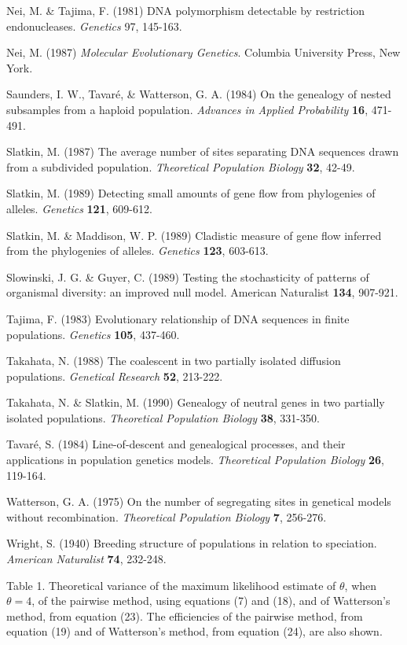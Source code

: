{Nei, M. \&  Tajima, F.  (1981)   DNA polymorphism detectable by
restriction endonucleases.  {\it Genetics} {97}, 145-163.
\medskip

Nei, M. (1987)   {\it Molecular Evolutionary Genetics}.  Columbia
University Press, New York.
\medskip

Saunders, I. W., Tavar\'{e}, \& Watterson, G. A. (1984)  On the genealogy of nested subsamples from a
haploid population.  {\it Advances in Applied Probability}  {\bf 16}, 471-491.
\medskip

Slatkin, M. (1987)  The average number of sites separating DNA sequences
drawn from a subdivided population.  {\it Theoretical Population Biology}  {\bf 32}, 42-49.
\medskip

Slatkin, M. (1989)  Detecting small amounts of gene flow from phylogenies of
alleles.  {\it Genetics}  {\bf 121}, 609-612.
\medskip

Slatkin, M. \& Maddison, W. P.  (1989)  Cladistic measure of gene flow
inferred from the phylogenies of alleles.  {\it Genetics}  {\bf 123}, 603-613.
\medskip

Slowinski, J. G. \& Guyer, C. (1989) Testing the stochasticity of patterns
of organismal diversity: an improved null model.  {American Naturalist} {\bf 134}, 907-921.

Tajima, F. (1983)   Evolutionary relationship of DNA sequences in finite
populations. {\it Genetics} {\bf 105}, 437-460.
\medskip

Takahata, N. (1988)  The coalescent in two partially isolated diffusion
populations.  {\it Genetical Research}  {\bf 52}, 213-222.
\medskip

Takahata, N. \& Slatkin, M. (1990)  Genealogy of neutral genes in two partially
isolated populations.  {\it Theoretical Population Biology} {\bf 38}, 331-350.
\medskip

Tavar\'{e}, S.  (1984)  Line-of-descent and genealogical processes, and their
applications in population genetics models.  {\it Theoretical Population
Biology}  {\bf 26}, 119-164.
\medskip

Watterson, G. A.  (1975)  On the number of segregating sites in genetical
models without recombination.  {\it Theoretical Population Biology} {\bf 7}, 256-276.
\medskip

Wright, S. (1940)  Breeding structure of populations in relation to
speciation.  {\it American Naturalist}  {\bf 74}, 232-248.
\medskip
}

\newpage

Table 1.  Theoretical variance of the maximum likelihood estimate of
$\theta$, when $\theta = 4$, of the pairwise method, using equations
(7) and (18), and of Watterson's method, from equation
(23).  The efficiencies of the pairwise method, from
equation (19) and of Watterson's method, from equation (24), are also
shown.

